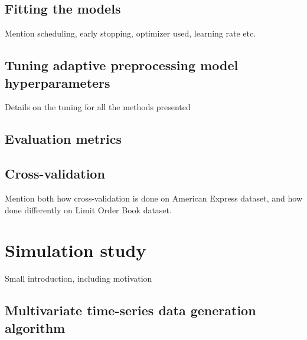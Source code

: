 \documentclass{statsmsc}
\begin{document}
{%

\subsection{Fitting the models}%
\label{sub:Fitting the models}

Mention scheduling, early stopping, optimizer used, learning rate etc.

\subsection{Tuning adaptive preprocessing model hyperparameters}%
\label{sub:Tuning adaptive preprocessing model hyperparameters}

Details on the tuning for all the methods presented

\subsection{Evaluation metrics}%
\label{sub:Evaluation metrics}


\subsection{Cross-validation}%
\label{sub:Cross-validation}

Mention both how cross-validation is done on American Express dataset, and how done differently
on Limit Order Book dataset.


\section{Simulation study}%
\label{sec:Simulation study}%

Small introduction, including motivation

\subsection{Multivariate time-series data generation algorithm}%
\label{sub:Multivariate time-series data generation algorithm}



}
\end{document}
